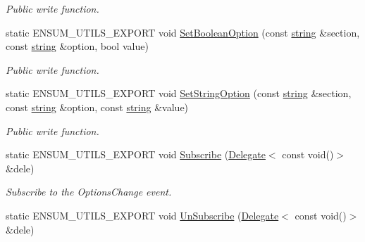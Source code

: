 \begin{DoxyCompactItemize}
\begin{DoxyCompactList}\small\item\em Public write function. \end{DoxyCompactList}\item 
static E\+N\+S\+U\+M\+\_\+\+U\+T\+I\+L\+S\+\_\+\+E\+X\+P\+O\+RT void \hyperlink{class_ensum_1_1_utils_1_1_options_a68837babb89a589bc49180fd849b2c28}{Set\+Boolean\+Option} (const \hyperlink{class_ensum_1_1string}{string} \&section, const \hyperlink{class_ensum_1_1string}{string} \&option, bool value)\hypertarget{class_ensum_1_1_utils_1_1_options_a68837babb89a589bc49180fd849b2c28}{}\label{class_ensum_1_1_utils_1_1_options_a68837babb89a589bc49180fd849b2c28}

\begin{DoxyCompactList}\small\item\em Public write function. \end{DoxyCompactList}\item 
static E\+N\+S\+U\+M\+\_\+\+U\+T\+I\+L\+S\+\_\+\+E\+X\+P\+O\+RT void \hyperlink{class_ensum_1_1_utils_1_1_options_a67df741524fdcd73f377d3b65f9699c9}{Set\+String\+Option} (const \hyperlink{class_ensum_1_1string}{string} \&section, const \hyperlink{class_ensum_1_1string}{string} \&option, const \hyperlink{class_ensum_1_1string}{string} \&value)\hypertarget{class_ensum_1_1_utils_1_1_options_a67df741524fdcd73f377d3b65f9699c9}{}\label{class_ensum_1_1_utils_1_1_options_a67df741524fdcd73f377d3b65f9699c9}

\begin{DoxyCompactList}\small\item\em Public write function. \end{DoxyCompactList}\item 
static E\+N\+S\+U\+M\+\_\+\+U\+T\+I\+L\+S\+\_\+\+E\+X\+P\+O\+RT void \hyperlink{class_ensum_1_1_utils_1_1_options_a0e7f1fc995faacdd3df031f1703eb163}{Subscribe} (\hyperlink{class_ensum_1_1_delegate}{Delegate}$<$ const void()$>$ \&dele)
\begin{DoxyCompactList}\small\item\em Subscribe to the Options\+Change event. \end{DoxyCompactList}\item 
static E\+N\+S\+U\+M\+\_\+\+U\+T\+I\+L\+S\+\_\+\+E\+X\+P\+O\+RT void \hyperlink{class_ensum_1_1_utils_1_1_options_a33199a658e631aa6e9a5a39de823c563}{Un\+Subscribe} (\hyperlink{class_ensum_1_1_delegate}{Delegate}$<$ const void()$>$ \&dele)\hypertarget{class_ensum_1_1_utils_1_1_options_a33199a658e631aa6e9a5a39de823c563}{}\label{class_ensum_1_1_utils_1_1_options_a33199a658e631aa6e9a5a39de823c563}


\end{DoxyCompactItemize}
